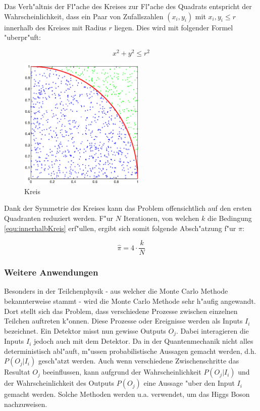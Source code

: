 \begin{refsection}
Das Verh"altnis der Fl"ache des Kreises zur Fl"ache des Quadrats
entspricht der Wahrscheinlichkeit, dass ein Paar von Zufallszahlen
$(x_i,y_i)$ mit $x_i,y_i \leq r$ innerhalb des Kreises mit Radius $r$
liegen. Dies wird mit folgender Formel "uberpr"uft:

\begin{equation}
	x^2 + y^2 \leq r^2
	\label{equ:innerhalbKreis}
\end{equation}

\begin{figure}[htbp]
	\centering
	\includegraphics[width=6cm]{montecarlo/images/kreis_hitmiss.eps}
	\caption{Kreis}
	\label{fig:KreisHitMiss}
\end{figure}

Dank der Symmetrie des Kreises kann das Problem offensichtlich auf den
ersten Quadranten reduziert werden. F"ur $N$ Iterationen, von welchen
$k$ die Bedingung \ref{equ:innerhalbKreis} erf"ullen, ergibt sich somit
folgende Absch"atzung f"ur $\pi$:

\begin{equation}
	\hat{\pi} = 4 \cdot \frac{k}{N}
\end{equation}


\subsubsection{Weitere Anwendungen}
Besonders in der Teilchenphysik - aus welcher die Monte Carlo Methode
bekannterweise stammt - wird die Monte Carlo Methode sehr h"aufig
angewandt. Dort stellt sich das Problem, dass verschiedene Prozesse
zwischen einzelnen Teilchen auftreten k"onnen. Diese Prozesse oder
Ereignisse werden als Inputs $I_i$ bezeichnet. Ein Detektor misst nun
gewisse Outputs $O_j$. Dabei interagieren die Inputs $I_i$ jedoch auch
mit dem Detektor. Da in der Quantenmechanik nicht alles deterministisch
abl"auft, m"ussen probabilistische Aussagen gemacht werden, d.h. $P(O_j
| I_i)$ gesch"atzt werden. Auch wenn verschiedene Zwischenschritte das
Resultat $O_j$ beeinflussen, kann aufgrund der Wahrscheinlichkeit $P(O_j |
I_i)$ und der Wahrscheinlichkeit des Outputs $P(O_j)$ eine Aussage "uber
den Input $I_i$ gemacht werden. Solche Methoden werden u.a. verwendet,
um das Higgs Boson nachzuweisen. 


\end{refsection}
